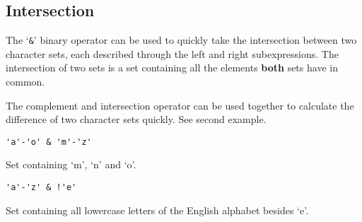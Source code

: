 
\subsection{Intersection}
{
	The `\texttt{\&}' binary operator can be used to quickly take the
	intersection between two character sets, each described through
	the left and right subexpressions. The intersection of two sets is
	a set containing all the elements \textbf{both} sets have in common.
	
	The complement and intersection operator can be used together to calculate
	the difference of two character sets quickly. See second example.
	
	\begin{itemize}
	{
		\item[] \lstinline[language=MAIA, columns=fixed]@'a'-'o' & 'm'-'z'@
		
			Set containing `m', `n' and `o'.
		
		\item[] \lstinline[language=MAIA, columns=fixed]@'a'-'z' & !'e'@
		
			Set containing all lowercase letters
			of the English alphabet besides `e'.
	}
	\end{itemize}
}
